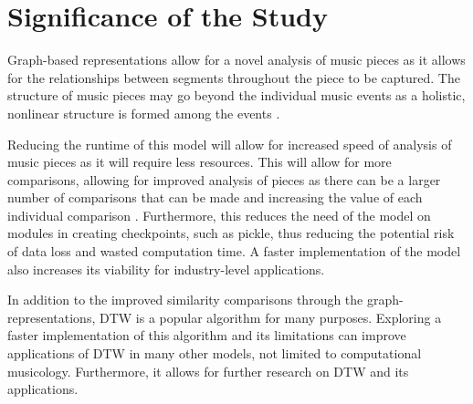 \section{Significance of the Study}

Graph-based representations allow for a novel analysis of music pieces as it allows for the relationships between segments throughout the piece to be captured. The structure of music pieces may go beyond the individual music events as a holistic, nonlinear structure is formed among the events \cite{HernandezOlivanBeltran}. 

Reducing the runtime of this model will allow for increased speed of analysis of music pieces as it will require less resources. This will allow for more comparisons, allowing for improved analysis of pieces as there can be a larger number of comparisons that can be made and increasing the value of each individual comparison \cite{ClarkCook}. Furthermore, this reduces the need of the model on modules in creating checkpoints, such as pickle, thus reducing the potential risk of data loss and wasted computation time. A faster implementation of the model also increases its viability for industry-level applications. 

In addition to the improved similarity comparisons through the graph-representations, DTW is a popular algorithm for many purposes. Exploring a faster implementation of this algorithm and its limitations can improve applications of DTW in many other models, not limited to computational musicology. Furthermore, it allows for further research on DTW and its applications.
